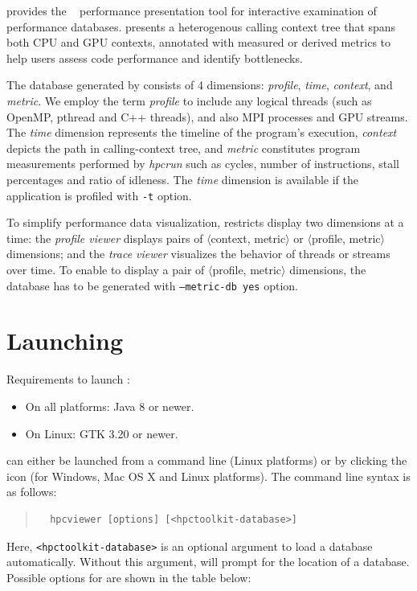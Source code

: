 

\HPCToolkit{} provides the \hpcviewer{}~\cite{Adhianto-MC-Ta:2010:PSTI-hpcviewer,Tallent-MC-etal:2011:ICS-hpctoolkit-scalable-tracing} performance presentation tool for interactive examination of performance databases.
\hpcviewer{}  presents a heterogenous
calling context tree that spans both CPU and GPU contexts, annotated
with measured or derived metrics to help users assess code performance
and identify bottlenecks.

The database generated by \hpcprof{} consists of 4 dimensions: \emph{profile}, \emph{time}, \emph{context}, and \emph{metric}.  
We employ the term \emph{profile} to include any logical threads (such as OpenMP, pthread and C++ threads), and also MPI processes and GPU streams.
The \emph{time} dimension represents the timeline of the program's execution, \emph{context} depicts the path in calling-context tree, and \emph{metric} constitutes program measurements performed by \textit{hpcrun} such as cycles, number of instructions, stall percentages and ratio of idleness.
The \emph{time} dimension is available if the application is profiled with \hpcrun{} \texttt{-t} option.  


To simplify performance data visualization, \hpcviewer{} restricts
display two dimensions at a time: the \emph{profile viewer} displays
pairs of $\langle$context, metric$\rangle$ or $\langle$profile,
metric$\rangle$ dimensions; and the \emph{trace viewer} visualizes the
behavior of threads or streams over time.
To enable to display a pair of $\langle$profile, metric$\rangle$ dimensions, the database has to be generated with \hpcprof{} \texttt{--metric-db yes} option.



\section{Launching}

Requirements to launch \hpcviewer:
\begin{itemize}
 \item On all platforms: Java 8 or newer. 
 \item On Linux: GTK 3.20 or newer.
\end{itemize}

\hpcviewer{} can either be launched from a command line (Linux platforms) or by clicking the \hpcviewer{} icon (for Windows, Mac OS X and Linux platforms).
The command line syntax is as follows:
\begin{quote}
\begin{verbatim}
  hpcviewer [options] [<hpctoolkit-database>]
\end{verbatim}
\end{quote}
Here, \texttt{<hpctoolkit-database>} is an optional argument to load a database automatically.
Without this argument, \hpcviewer{} will prompt for the location of a database. Possible options for \hpcviewer{}  are shown in the table below:\\

